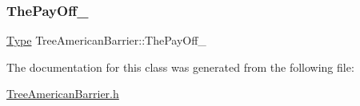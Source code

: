 \subsubsection{\texorpdfstring{The\+Pay\+Off\+\_\+}{ThePayOff\_}}
{\footnotesize\ttfamily \hyperlink{classTreeAmericanBarrier_a52c7d9a606b0075d8d1b69c877771cbb}{Type} Tree\+American\+Barrier\+::\+The\+Pay\+Off\+\_\+}



The documentation for this class was generated from the following file\+:\begin{DoxyCompactItemize}
\item 
\hyperlink{TreeAmericanBarrier_8h}{Tree\+American\+Barrier.\+h}\end{DoxyCompactItemize}
